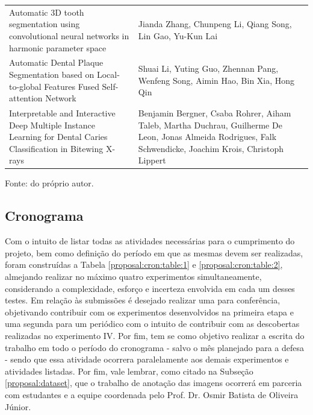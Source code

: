 \begin{table}[H]
{\begin{tabular}{l|l|l}
        Automatic 3D tooth segmentation using convolutional neural networks in harmonic parameter space                                 & Jianda Zhang, Chunpeng Li, Qiang Song, Lin Gao, Yu-Kun Lai                                                                                                                                                            &  \cite{Zhang2020}       \\
        Automatic Dental Plaque Segmentation based on Local-to-global Features Fused Self-attention Network                             & Shuai Li, Yuting Guo, Zhennan Pang, Wenfeng Song, Aimin Hao, Bin Xia, Hong Qin                                                                                                                                        &  \cite{Li2022}          \\
        Interpretable and Interactive Deep Multiple Instance Learning for Dental Caries Classification in Bitewing X-rays               & Benjamin Bergner, Csaba Rohrer, Aiham Taleb, Martha Duchrau, Guilherme De Leon, Jonas Almeida Rodrigues, Falk Schwendicke, Joachim Krois, Christoph Lippert                                                           &  \cite{Bergner2021}  
    \end{tabular}}

    \vspace*{1 cm}
    Fonte: do próprio autor.
\end{table}


\subsection{Cronograma}
\label{proposal:cron}
Com o intuito de listar todas as atividades necessárias para o cumprimento do projeto, bem como definição do período em que as mesmas devem ser realizadas, foram construídas a Tabela \ref{proposal:cron:table:1} e \ref{proposal:cron:table:2}, almejando realizar no máximo quatro  experimentos simultaneamente, considerando a complexidade, esforço e incerteza envolvida em cada um desses testes. Em relação às submissões é desejado realizar uma para conferência, objetivando  contribuir com os experimentos desenvolvidos na primeira etapa e uma segunda para um periódico com o intuito de contribuir com as descobertas realizadas no experimento IV. Por fim, tem se como objetivo realizar a escrita do trabalho em todo o período do cronograma - salvo o mês planejado para a defesa - sendo que essa atividade ocorrera paralelamente aos demais experimentos e atividades listadas. Por fim, vale lembrar, como citado na Subseção \ref{proposal:dataset}, que o trabalho de anotação das imagens ocorrerá em parceria com estudantes e a equipe coordenada pelo Prof. Dr. Osmir Batista de Oliveira Júnior. 

